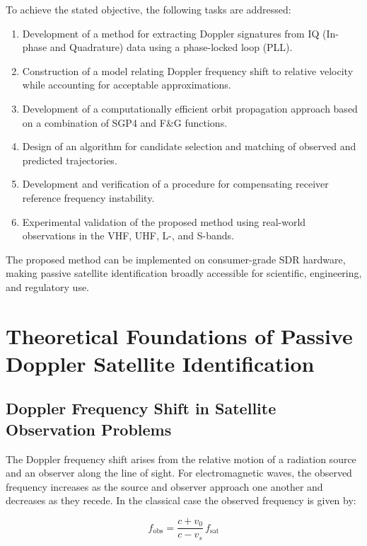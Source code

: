 \documentclass[lineno,pdflatex,sn-basic,referee,]{sn-jnl}
\begin{document}
To achieve the stated objective, the following tasks are addressed:

\begin{enumerate}
    \item Development of a method for extracting Doppler signatures from IQ (In-phase and Quadrature) data using a phase-locked loop (PLL).
    \item Construction of a model relating Doppler frequency shift to relative velocity while accounting for acceptable approximations.
    \item Development of a computationally efficient orbit propagation approach based on a combination of SGP4 and F\&G functions.
    \item Design of an algorithm for candidate selection and matching of observed and predicted trajectories.
    \item Development and verification of a procedure for compensating receiver reference frequency instability.
    \item Experimental validation of the proposed method using real-world observations in the VHF, UHF, L-, and S-bands.
\end{enumerate}

The proposed method can be implemented on consumer-grade SDR hardware, making passive satellite identification broadly accessible for scientific, engineering, and regulatory use.

\section{Theoretical Foundations of Passive Doppler Satellite Identification}
\label{sec:theory}

\subsection{Doppler Frequency Shift in Satellite Observation Problems}
\label{subsec:doppler-shift}

The Doppler frequency shift arises from the relative motion of a radiation source and an observer along the line of sight. For electromagnetic waves, the observed frequency increases as the source and observer approach one another and decreases as they recede. In the classical case the observed frequency is given by:

\begin{equation}
    f_{\mathrm{obs}} = \frac{c + v_0}{c - v_s}\,f_{\mathrm{sat}}
    \label{eq:doppler-classical}
\end{equation}
\end{document}
